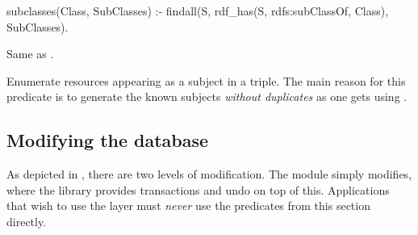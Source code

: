 \documentclass[11pt]{article}
\begin{document}
\begin{description}
\begin{code}
subclasses(Class, SubClasses) :-
        findall(S, rdf_has(S, rdfs:subClassOf, Class), SubClasses).
\end{code}

\noindent
Same as .

Enumerate resources appearing as a subject in a triple.  The main reason
for this predicate is to generate the known subjects \emph{without
duplicates} as one gets using .
\end{description}


\subsection{Modifying the database}		\label{sec:rdfmodify}

As depicted in , there are two levels of modification.
The  module simply modifies, where the 
library provides transactions and undo on top of this.  Applications
that wish to use the  layer must \emph{never} use the
predicates from this section directly.
\end{document}
